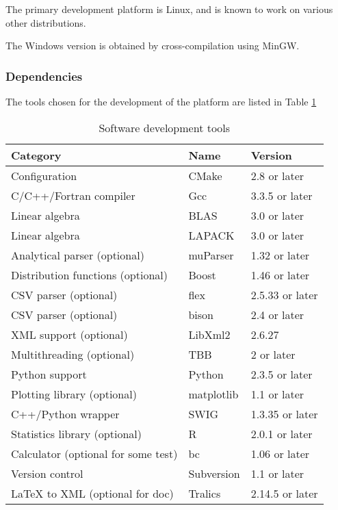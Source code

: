 The primary development platform is Linux, and is known to work on various other distributions.

The Windows version is obtained by cross-compilation using MinGW.

\subsubsection{Dependencies}

The tools chosen for the development of the platform are listed in Table \ref{tools}

\begin{center}
\begin{table}[h]
\caption{\label{tools}Software development tools}
\begin{center}
\begin{tabular}{|l|l|l|}
\hline
\textbf{Category} & \textbf{Name} & \textbf{Version} \\
\hline \hline
Configuration & CMake & 2.8 or later \\
C/C++/Fortran compiler & Gcc & 3.3.5 or later \\
Linear algebra & BLAS & 3.0 or later \\
Linear algebra & LAPACK & 3.0 or later \\
Analytical parser (optional) & muParser & 1.32 or later \\
Distribution functions (optional) & Boost & 1.46 or later \\
CSV parser (optional) & flex & 2.5.33 or later \\
CSV parser (optional) & bison & 2.4 or later \\
XML support (optional) & LibXml2 & 2.6.27 \\
Multithreading (optional) & TBB & 2 or later \\
Python support & Python & 2.3.5 or later \\
Plotting library (optional) & matplotlib & 1.1 or later \\
C++/Python wrapper & SWIG & 1.3.35 or later \\
Statistics library (optional) & R & 2.0.1 or later \\
Calculator (optional for some test) & bc & 1.06 or later \\
Version control & Subversion & 1.1 or later \\
LaTeX to XML (optional for doc) & Tralics & 2.14.5 or later \\
\hline
\end{tabular}
\end{center}
\end{table}
\end{center}

